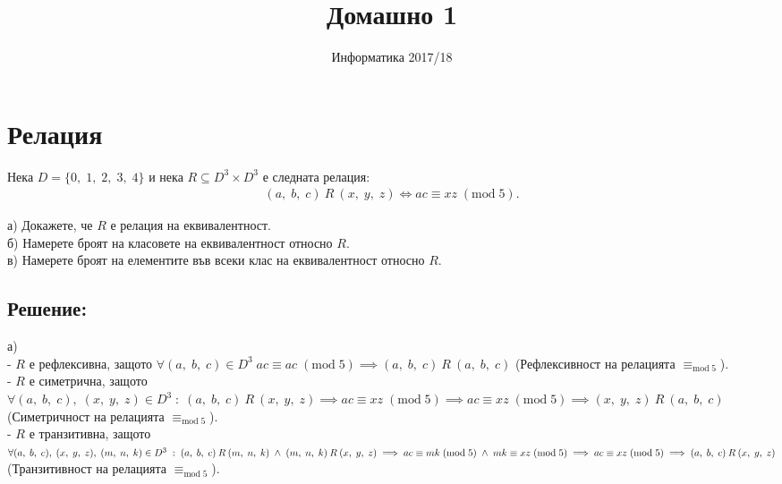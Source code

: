 \documentclass[a4paper, 12pt, oneside]{article}
\title{Домашно 1}
\author{Информатика 2017/18}
\begin{document}
\maketitle
    
\section*{Релация}
Нека $D = \{0, \; 1, \; 2, \; 3, \; 4\}$ и нека $R \subseteq D^3 \times D^3$
е следната релация:
\begin{align*}
    (a, \; b, \; c) \: R \: (x, \; y, \; z) \iff ac \equiv xz \; (\mathrm{mod} \; 5).
\end{align*}

а) Докажете, че $R$ е релация на еквивалентност. \\

б) Намерете броят на класовете на еквивалентност относно $R$. \\

в) Намерете броят на елементите във всеки клас на еквивалентност относно $R$.

\subsection*{Решение:}
а) \\

- $R$ е рефлексивна, защото $\forall (a, \; b, \; c) \in D^3 \; ac \equiv ac \; (\mathrm{mod} \; 5)
\implies (a, \; b, \; c) \: R \: (a, \; b, \; c) $
(Рефлексивност на релацията $\equiv_{\mathrm{mod} \; 5}$). \\

- $R$ е симетрична, защото $\forall (a, \; b, \; c), \; (x, \; y, \; z) \in D^3 \; : \;
(a, \; b, \; c) \: R \: (x, \; y, \; z) \implies ac \equiv xz \; (\mathrm{mod} \; 5)
\implies ac \equiv xz \; (\mathrm{mod} \; 5) \implies (x, \; y, \; z) \: R \: (a, \; b, \; c)$ \\
(Симетричност на релацията $\equiv_{\mathrm{mod} \; 5}$). \\

- $R$ е транзитивна, защото \\
$\forall (a, \; b, \; c), \; (x, \; y, \; z), \; (m, \; n, \; k) \in D^3 \; : \;
(a, \; b, \; c) \: R \: (m, \; n, \; k) \; \land \; (m, \; n, \; k) \: R \: (x, \; y, \; z) \\
\implies ac \equiv mk \; (\mathrm{mod} \; 5) \; \land \; mk \equiv xz \; (\mathrm{mod} \; 5) \implies
ac \equiv xz \; (\mathrm{mod} \; 5) \implies (a, \; b, \; c) \: R \: (x, \; y, \; z)$
(Транзитивност на релацията $\equiv_{\mathrm{mod} \; 5}$). \\
\end{document}
